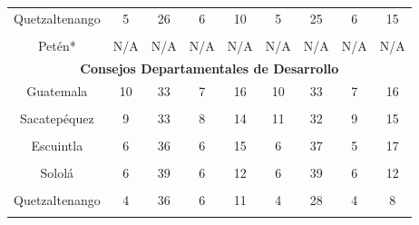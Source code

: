 {\begin{tabular}[t]{ccccccccc}
Quetzaltenango & 5 & 26 & 6 & 10 & 5 & 25 & 6 & 15\\
\cellcolor[HTML]{B6B3FF}{Quiché} & \cellcolor[HTML]{B6B3FF}{8} & \cellcolor[HTML]{B6B3FF}{23} & \cellcolor[HTML]{B6B3FF}{7} & \cellcolor[HTML]{B6B3FF}{16} & \cellcolor[HTML]{B6B3FF}{7} & \cellcolor[HTML]{B6B3FF}{25} & \cellcolor[HTML]{B6B3FF}{7} & \cellcolor[HTML]{B6B3FF}{18}\\
Petén* & N/A & N/A & N/A & N/A & N/A & N/A & N/A & N/A\\
\midrule
\multicolumn{9}{c}{\color{color3}\textbf{Consejos Departamentales de Desarrollo}}\\
\midrule
Guatemala & 10 & 33 & 7 & 16 & 10 & 33 & 7 & 16\\
\cellcolor[HTML]{B6B3FF}{El Progreso} & \cellcolor[HTML]{B6B3FF}{6} & \cellcolor[HTML]{B6B3FF}{22} & \cellcolor[HTML]{B6B3FF}{4} & \cellcolor[HTML]{B6B3FF}{12} & \cellcolor[HTML]{B6B3FF}{6} & \cellcolor[HTML]{B6B3FF}{25} & \cellcolor[HTML]{B6B3FF}{7} & \cellcolor[HTML]{B6B3FF}{12}\\
Sacatepéquez & 9 & 33 & 8 & 14 & 11 & 32 & 9 & 15\\
\cellcolor[HTML]{B6B3FF}{Chimaltenango} & \cellcolor[HTML]{B6B3FF}{8} & \cellcolor[HTML]{B6B3FF}{37} & \cellcolor[HTML]{B6B3FF}{13} & \cellcolor[HTML]{B6B3FF}{12} & \cellcolor[HTML]{B6B3FF}{12} & \cellcolor[HTML]{B6B3FF}{34} & \cellcolor[HTML]{B6B3FF}{9} & \cellcolor[HTML]{B6B3FF}{16}\\
Escuintla & 6 & 36 & 6 & 15 & 6 & 37 & 5 & 17\\
\cellcolor[HTML]{B6B3FF}{Santa Rosa} & \cellcolor[HTML]{B6B3FF}{5} & \cellcolor[HTML]{B6B3FF}{34} & \cellcolor[HTML]{B6B3FF}{4} & \cellcolor[HTML]{B6B3FF}{14} & \cellcolor[HTML]{B6B3FF}{4} & \cellcolor[HTML]{B6B3FF}{35} & \cellcolor[HTML]{B6B3FF}{6} & \cellcolor[HTML]{B6B3FF}{13}\\
Sololá & 6 & 39 & 6 & 12 & 6 & 39 & 6 & 12\\
\cellcolor[HTML]{B6B3FF}{Totonicapán} & \cellcolor[HTML]{B6B3FF}{6} & \cellcolor[HTML]{B6B3FF}{26} & \cellcolor[HTML]{B6B3FF}{6} & \cellcolor[HTML]{B6B3FF}{14} & \cellcolor[HTML]{B6B3FF}{5} & \cellcolor[HTML]{B6B3FF}{26} & \cellcolor[HTML]{B6B3FF}{6} & \cellcolor[HTML]{B6B3FF}{14}\\
Quetzaltenango & 4 & 36 & 6 & 11 & 4 & 28 & 4 & 8\\
\cellcolor[HTML]{B6B3FF}{Suchitepéquez} & \cellcolor[HTML]{B6B3FF}{18} & \cellcolor[HTML]{B6B3FF}{52} & \cellcolor[HTML]{B6B3FF}{18} & \cellcolor[HTML]{B6B3FF}{26} & \cellcolor[HTML]{B6B3FF}{13} & \cellcolor[HTML]{B6B3FF}{48} & \cellcolor[HTML]{B6B3FF}{13} & \cellcolor[HTML]{B6B3FF}{25}\\

\end{tabular}}
